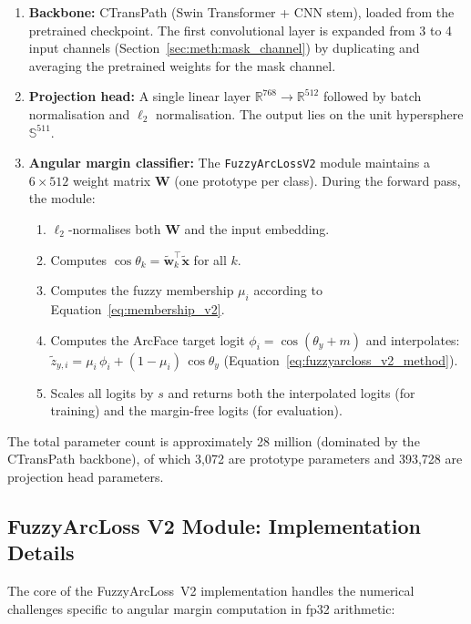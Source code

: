 \begin{enumerate}
    \item \textbf{Backbone:} CTransPath (Swin Transformer + CNN stem), loaded from the pretrained checkpoint. The first convolutional layer is expanded from 3 to 4 input channels (Section~\ref{sec:meth:mask_channel}) by duplicating and averaging the pretrained weights for the mask channel.

    \item \textbf{Projection head:} A single linear layer $\mathbb{R}^{768} \to \mathbb{R}^{512}$ followed by batch normalisation and $\ell_2$ normalisation. The output lies on the unit hypersphere $\mathbb{S}^{511}$.

    \item \textbf{Angular margin classifier:} The \texttt{FuzzyArcLossV2} module maintains a $6 \times 512$ weight matrix $\mathbf{W}$ (one prototype per class). During the forward pass, the module:
    \begin{enumerate}
        \item $\ell_2$-normalises both $\mathbf{W}$ and the input embedding.
        \item Computes $\cos\theta_k = \tilde{\mathbf{w}}_k^\top \tilde{\mathbf{x}}$ for all $k$.
        \item Computes the fuzzy membership $\mu_i$ according to Equation~\ref{eq:membership_v2}.
        \item Computes the ArcFace target logit $\phi_i = \cos(\theta_y + m)$ and interpolates: $\tilde{z}_{y,i} = \mu_i \, \phi_i + (1 - \mu_i) \, \cos\theta_y$ (Equation~\ref{eq:fuzzyarcloss_v2_method}).
        \item Scales all logits by $s$ and returns both the interpolated logits (for training) and the margin-free logits (for evaluation).
    \end{enumerate}
\end{enumerate}

The total parameter count is approximately 28 million (dominated by the CTransPath backbone), of which 3{,}072 are prototype parameters and 393{,}728 are projection head parameters.

\subsection{FuzzyArcLoss V2 Module: Implementation Details}
\label{sec:impl:pattern:fuzzy_module}

The core of the FuzzyArcLoss~V2 implementation handles the numerical challenges specific to angular margin computation in fp32 arithmetic:

